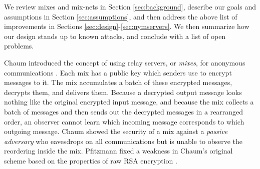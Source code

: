 \documentclass[times,10pt,twocolumn]{article}
\begin{document}

We review mixes and mix-nets in Section \ref{sec:background},
describe our goals and assumptions in Section \ref{sec:assumptions},
and then address the above list of improvements in Sections
\ref{sec:design}-\ref{sec:nymservers}. We then summarize how our design
stands up to known attacks, and conclude with a list of open problems.



%


\label{sec:background}

Chaum introduced the concept of using relay servers, or \emph{mixes},
for anonymous communications \cite{chaum-mix}. Each mix has a public key
which senders use to encrypt messages to it. The mix accumulates a batch
of these encrypted messages, decrypts them, and delivers them. Because
a decrypted output message looks nothing like the original encrypted
input message,
and because the mix collects a batch of messages and then sends out the
decrypted messages in a rearranged order, an observer cannot learn which incoming
message corresponds to which outgoing message. Chaum showed the
security of a mix against a \emph{passive adversary} who eavesdrops on
all communications but is unable to observe the reordering inside the mix.
Pfitzmann fixed a weakness in Chaum's original scheme based on the
properties of raw RSA encryption \cite{pfitzmann90how}.
\end{document}
